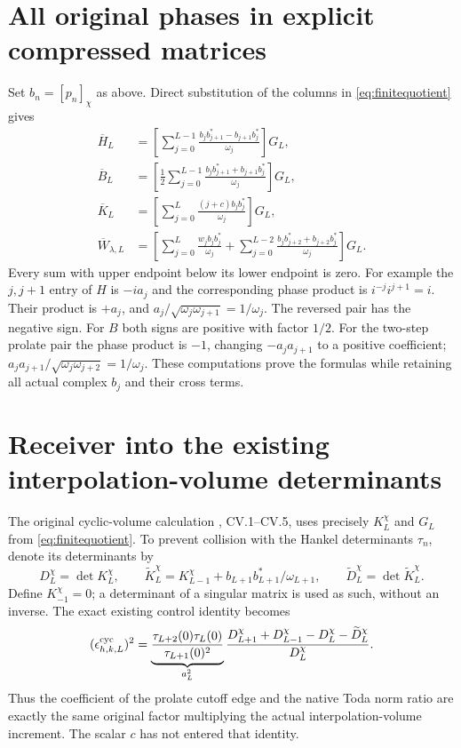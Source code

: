 \documentclass[11pt]{article}
\begin{document}
\section{All original phases in explicit compressed matrices}

Set $b_n=[p_n]_\chi$ as above. Direct substitution of
the columns in \eqref{eq:finitequotient} gives
\begin{equation}\label{eq:explicitcompressed}
 \begin{aligned}
 \overline H_L
 &=\left[\sum_{j=0}^{L-1}
       \frac{b_jb_{j+1}^*-b_{j+1}b_j^*}{\omega_j}\right]G_L,\\
 \overline B_L
 &=\left[\frac12\sum_{j=0}^{L-1}
       \frac{b_jb_{j+1}^*+b_{j+1}b_j^*}{\omega_j}\right]G_L,\\
 \overline K_L
 &=\left[\sum_{j=0}^L
                  \frac{(j+c)b_jb_j^*}{\omega_j}\right]G_L,\\
 \overline W_{\lambda,L}
 &=\left[\sum_{j=0}^L\frac{w_jb_jb_j^*}{\omega_j}
      +\sum_{j=0}^{L-2}
             \frac{b_jb_{j+2}^*+b_{j+2}b_j^*}{\omega_j}\right]G_L.
 \end{aligned}
\end{equation}
Every sum with upper endpoint below its lower endpoint
is zero. For example the $j,j+1$ entry of $H$ is
$-ia_j$ and the corresponding phase product is
$i^{-j}i^{j+1}=i$. Their product is $+a_j$,
and $a_j/\sqrt{\omega_j\omega_{j+1}}=1/\omega_j$.
The reversed pair has the negative sign. For $B$
both signs are positive with factor $1/2$.
For the two-step prolate pair the phase product is
$-1$, changing $-a_ja_{j+1}$ to a positive coefficient;
$a_ja_{j+1}/\sqrt{\omega_j\omega_{j+2}}=1/\omega_j$.
These computations prove the formulas while retaining
all actual complex $b_j$ and their cross terms.

\section{Receiver into the existing interpolation-volume determinants}

The original cyclic-volume calculation \cite{CV}, CV.1--CV.5,
uses precisely $K_L^\chi$ and $G_L$ from
\eqref{eq:finitequotient}. To prevent collision with the
Hankel determinants $\tau_n$, denote its determinants by
\[
 D_L^\chi=\det K_L^\chi,\qquad
 \widetilde K_L^\chi=K_{L-1}^\chi
                     +b_{L+1}b_{L+1}^*/\omega_{L+1},
 \qquad \widetilde D_L^\chi=\det\widetilde K_L^\chi.
\]
Define $K_{-1}^\chi=0$; a determinant of a singular
matrix is used as such, without an inverse.
The exact existing control identity becomes
\begin{equation}\label{eq:CVreceiver}
 (\epsilon_{h,k,L}^{\rm cyc})^2
 =\underbrace{\frac{\tau_{L+2}(0)\tau_L(0)}
                         {\tau_{L+1}(0)^2}}_{a_L^2}
   \frac{D_{L+1}^\chi+D_{L-1}^\chi
                    -D_L^\chi-\widetilde D_L^\chi}{D_L^\chi}.
\end{equation}
Thus the coefficient of the prolate cutoff edge and
the native Toda norm ratio are exactly the same original
factor multiplying the actual interpolation-volume
increment. The scalar $c$ has not entered that identity.
\end{document}
